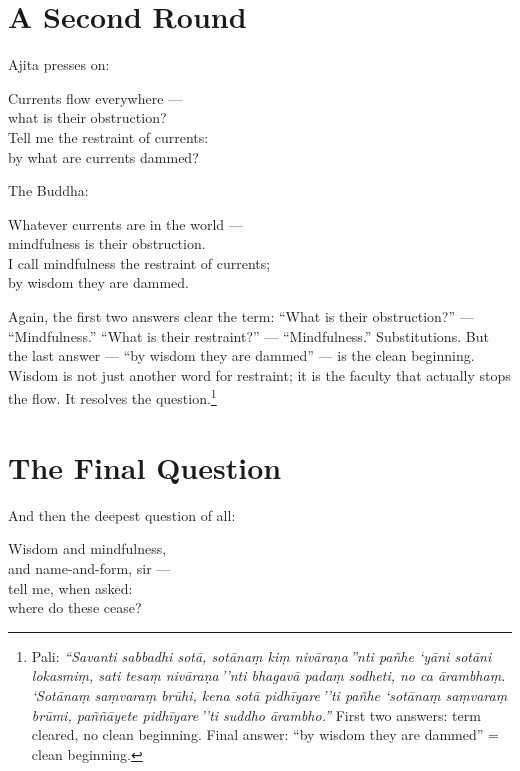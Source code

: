 \section*{A Second Round}

Ajita presses on:

\begin{versebox}
Currents flow everywhere ---\\
what is their obstruction?\\
Tell me the restraint of currents:\\
by what are currents dammed?
\end{versebox}

The Buddha:

\begin{versebox}
Whatever currents are in the world ---\\
mindfulness is their obstruction.\\
I call mindfulness the restraint of currents;\\
by wisdom they are dammed.
\end{versebox}

Again, the first two answers clear the term: ``What is their obstruction?'' --- ``Mindfulness.'' ``What is their restraint?'' --- ``Mindfulness.'' Substitutions. But the last answer --- ``by wisdom they are dammed'' --- is the clean beginning. Wisdom is not just another word for restraint; it is the faculty that actually stops the flow. It resolves the question.\footnote{Pali: \textit{``Savanti sabbadhi sotā, sotānaṃ kiṃ nivāraṇa\,''nti pañhe `yāni sotāni lokasmiṃ, sati tesaṃ nivāraṇa\,''nti bhagavā padaṃ sodheti, no ca ārambhaṃ. `Sotānaṃ saṃvaraṃ brūhi, kena sotā pidhīyare\,''ti pañhe `sotānaṃ saṃvaraṃ brūmi, paññāyete pidhīyare\,''ti suddho ārambho.''} First two answers: term cleared, no clean beginning. Final answer: ``by wisdom they are dammed'' = clean beginning.}

\section*{The Final Question}

And then the deepest question of all:

\begin{versebox}
Wisdom and mindfulness,\\
and name-and-form, sir ---\\
tell me, when asked:\\
where do these cease?
\end{versebox}

